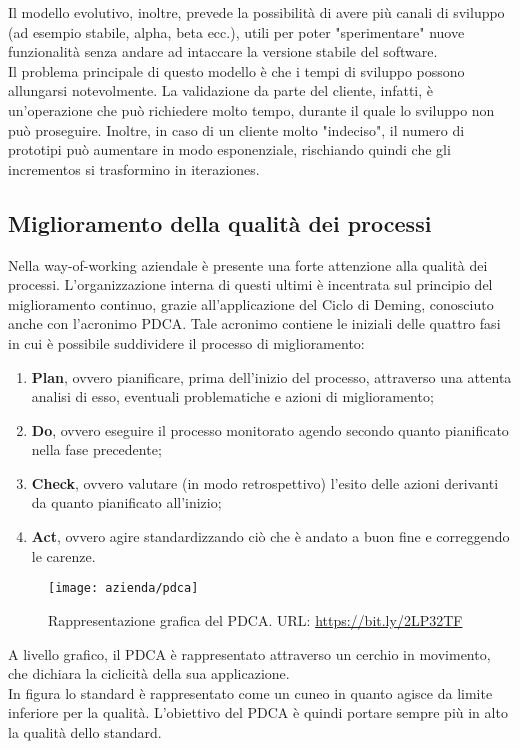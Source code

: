 Il modello evolutivo, inoltre, prevede la possibilità di avere più canali di sviluppo (ad esempio stabile, alpha, beta ecc.), utili per poter "sperimentare" nuove funzionalità senza andare ad intaccare la versione stabile del software.\\
Il problema principale di questo modello è che i tempi di sviluppo possono allungarsi notevolmente. La validazione da parte del cliente, infatti, è un'operazione che può richiedere molto tempo, durante il quale lo sviluppo non può proseguire. Inoltre, in caso di un cliente molto "indeciso", il numero di prototipi può aumentare in modo esponenziale, rischiando quindi che gli \glspl{incremento} si trasformino in \glspl{iterazione}.

\subsection{Miglioramento della qualità dei processi}
Nella way-of-working aziendale è presente una forte attenzione alla qualità dei processi. L'organizzazione interna di questi ultimi è incentrata sul principio del miglioramento continuo, grazie all'applicazione del Ciclo di Deming, conosciuto anche con l'acronimo PDCA. Tale acronimo contiene le iniziali delle quattro fasi in cui è possibile suddividere il processo di miglioramento: \begin{enumerate}
	\item \textbf{Plan}, ovvero pianificare, prima dell'inizio del processo, attraverso una attenta analisi di esso, eventuali problematiche e azioni di miglioramento;
	\item \textbf{Do}, ovvero eseguire il processo monitorato agendo secondo quanto pianificato nella fase precedente;
	\item \textbf{Check}, ovvero valutare (in modo retrospettivo) l'esito delle azioni derivanti da quanto pianificato all'inizio;
	\item \textbf{Act}, ovvero agire standardizzando ciò che è andato a buon fine e correggendo le carenze.
\end{enumerate}
\begin{figure}[!h] 
	\centering 
	\texttt{[image: azienda/pdca]} 
	\caption{Rappresentazione grafica del PDCA. URL: \url{https://bit.ly/2LP32TF} }
\end{figure}
A livello grafico, il PDCA è rappresentato attraverso un cerchio in movimento, che dichiara la ciclicità della sua applicazione.\\
In figura lo standard è rappresentato come un cuneo in quanto agisce da limite inferiore per la qualità. L'obiettivo del PDCA è quindi portare sempre più in alto la qualità dello standard.

